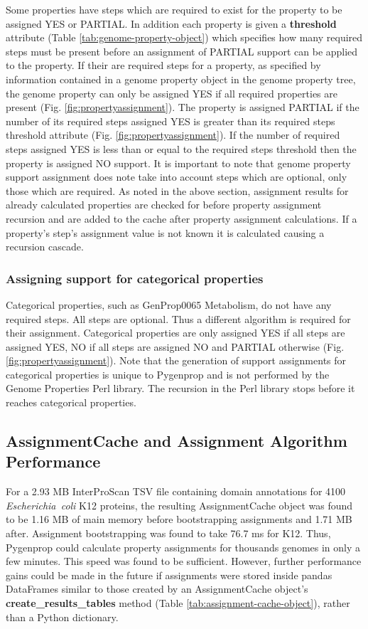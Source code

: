 Some properties have steps which are required to exist for the property to be assigned YES or PARTIAL. In addition each property is given a \textbf{threshold} attribute (Table \ref{tab:genome-property-object}) which specifies how many required steps must be present before an assignment of PARTIAL support can be applied to the property. If their are required steps for a property, as specified by information contained in a genome property object in the genome property tree, the genome property can only be assigned YES if all required properties are present (Fig. \ref{fig:propertyassignment}). The property is assigned PARTIAL if the number of its required steps assigned YES is greater than its required steps threshold attribute (Fig. \ref{fig:propertyassignment}). If the number of required steps assigned YES is less than or equal to the required steps threshold then the property is assigned NO support. It is important to note that genome property support assignment does note take into account steps which are optional, only those which are required. As noted in the above section, assignment results for already calculated properties are checked for before property assignment recursion and are added to the cache after property assignment calculations. If a property's step's assignment value is not known it is calculated causing a recursion cascade.

\subsubsection{Assigning support for categorical properties}

Categorical properties, such as GenProp0065 Metabolism, do not have any required steps. All steps are optional. Thus a different algorithm is required for their assignment. Categorical properties are only assigned YES if all steps are assigned YES, NO if all steps are assigned NO and PARTIAL otherwise (Fig. \ref{fig:propertyassignment}). Note that the generation of support assignments for categorical properties is unique to Pygenprop and is not performed by the Genome Properties Perl library. The recursion in the Perl library stops before it reaches categorical properties.

\subsection{AssignmentCache and Assignment Algorithm Performance}

For a 2.93 MB InterProScan TSV file containing domain annotations for 4100 \textit{Escherichia\ coli }K12 proteins, the resulting AssignmentCache object was found to be 1.16 MB of main memory before bootstrapping assignments and 1.71 MB after. Assignment bootstrapping was found to take 76.7  ms for K12. Thus, Pygenprop could calculate property assignments for thousands genomes in only a few minutes. This speed was found to be sufficient. However, further performance gains could be made in the future if assignments were stored inside pandas DataFrames \cite{mckinney2010data} similar to those created by an AssignmentCache object's \textbf{create\_results\_tables} method (Table \ref{tab:assignment-cache-object}), rather than a Python dictionary.

